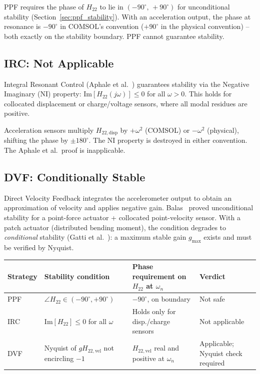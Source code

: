 \documentclass[12pt,a4paper]{article}
\begin{document}
PPF requires the phase of $H_{22}$ to lie in $(-90^\circ,\, +90^\circ)$ for
unconditional stability (Section~\ref{sec:ppf_stability}).  With an acceleration
output, the phase at resonance is $-90^\circ$ in COMSOL's convention ($+90^\circ$
in the physical convention) -- both exactly on the stability boundary.  PPF
cannot guarantee stability.

\subsection{IRC: Not Applicable}
\label{sec:irc_reject}

Integral Resonant Control (Aphale et al.~\cite{aphale2007}) guarantees stability
via the Negative Imaginary (NI) property: $\mathrm{Im}[H_{22}(j\omega)] \leq 0$
for all $\omega > 0$.  This holds for collocated displacement or
charge/voltage sensors, where all modal residues are positive.

Acceleration sensors multiply $H_{22,\text{disp}}$ by $+\omega^2$ (COMSOL) or
$-\omega^2$ (physical), shifting the phase by $\pm 180^\circ$.  The NI property
is destroyed in either convention.  The Aphale et al.\ proof is inapplicable.

\subsection{DVF: Conditionally Stable}
\label{sec:dvf_applicable}

Direct Velocity Feedback integrates the accelerometer output to obtain an
approximation of velocity and applies negative gain.  Balas~\cite{balas1979}
proved unconditional stability for a point-force actuator + collocated
point-velocity sensor.  With a patch actuator (distributed bending moment), the
condition degrades to \emph{conditional} stability (Gatti et al.~\cite{gatti2007}):
a maximum stable gain $g_\text{max}$ exists and must be verified by Nyquist.

\begin{center}
\begin{tabular}{p{2.8cm} p{3.5cm} p{3.2cm} p{3.5cm}}
\toprule
Strategy & Stability condition & Phase requirement on $H_{22}$ at $\omega_n$ & Verdict \\
\midrule
PPF & $\angle H_{22}\in(-90^\circ,+90^\circ)$ & $-90^\circ$, on boundary & Not safe \\[4pt]
IRC & $\mathrm{Im}[H_{22}] \leq 0$ for all $\omega$ & Holds only for disp./charge sensors & Not applicable \\[4pt]
DVF & Nyquist of $gH_{22,\text{vel}}$ not encircling $-1$ & $H_{22,\text{vel}}$ real and positive at $\omega_n$ & Applicable; Nyquist check required \\
\bottomrule
\end{tabular}
\end{center}
\end{document}
